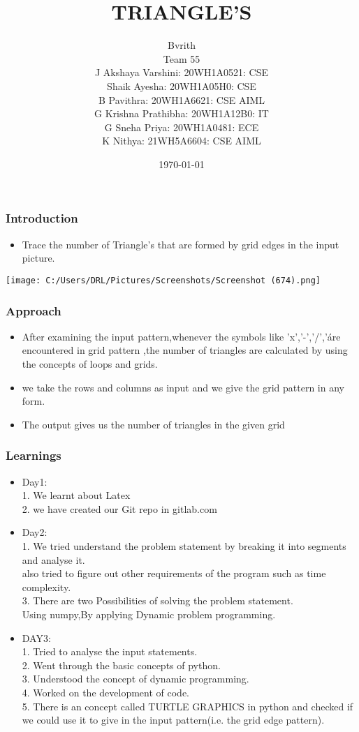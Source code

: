 \documentclass[14pt]{beamer}
\title{TRIANGLE'S}
\date{\today}
\author{Bvrith \\ Team 55 \\ J Akshaya Varshini: 20WH1A0521: CSE \\ Shaik Ayesha: 20WH1A05H0: CSE \\ B Pavithra: 20WH1A6621: CSE AIML \\ G Krishna Prathibha: 20WH1A12B0: IT \\ G Sneha Priya: 20WH1A0481: ECE \\ K Nithya: 21WH5A6604: CSE AIML}
\begin{document}
    \begin{frame}
        \titlepage
    \end{frame}
    \begin{frame}
	\frametitle{Introduction}
        \begin{itemize}
	    \item Trace the number of Triangle's that are formed by grid edges in the input picture.		
	\end{itemize}
    \end{frame}\centerline{\texttt{[image: C:/Users/DRL/Pictures/Screenshots/Screenshot (674).png]}}
    \begin{frame}
	\frametitle{Approach}
	\begin{itemize}
	    \item After examining the input pattern,whenever the symbols like 'x','-','/','\' are encountered in grid pattern ,the number of triangles are calculated by using the concepts of loops and grids.
			   
	    \item we take the rows and columns as input and we  give the grid pattern in any form.
	    \item The output gives us the number of triangles in  the given grid  
	\end{itemize}
    \end{frame}
    \begin{frame}
        \frametitle{Learnings}
	\begin{itemize}
	    \item Day1: \\ 1. We learnt about Latex \\ 2. we have created our Git repo in gitlab.com \\
	    \item Day2: \\ 1. We tried understand the problem statement by breaking it into segments and analyse it. \\ also tried to figure out other requirements of the program such as time complexity.
	    \\ 3. There are two Possibilities of solving the problem statement. \\ Using numpy,By applying Dynamic problem programming.
		    \end{itemize}
	    \end{frame}
	\begin{frame}
	\begin{itemize}
	       \item DAY3: \\ 1. Tried to analyse the input statements.\\ 2. Went through the basic concepts of python. \\ 3. Understood the concept of dynamic programming. \\ 4. Worked on the development of code. \\ 5. There is an concept called TURTLE GRAPHICS in python and checked if we could use it to give in the input pattern(i.e. the grid edge pattern).
	        
	
\end{itemize}	  
\end{frame} 
\end{document}
